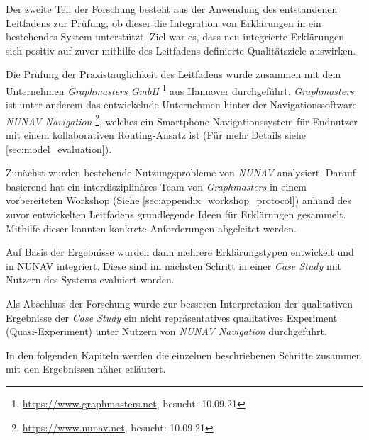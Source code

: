 \bigbreak

Der zweite Teil der Forschung besteht aus der Anwendung des entstandenen Leitfadens zur Prüfung, ob dieser die Integration von Erklärungen in ein bestehendes System unterstützt. Ziel war es, dass neu integrierte Erklärungen sich positiv auf zuvor mithilfe des Leitfadens definierte Qualitätsziele auswirken.

Die Prüfung der Praxistauglichkeit des Leitfadens wurde zusammen mit dem Unternehmen \textit{Graphmasters GmbH} \footnote{\url{https://www.graphmasters.net}, besucht: 10.09.21} aus Hannover durchgeführt. \textit{Graphmasters} ist unter anderem das entwickelnde Unternehmen hinter der Navigationssoftware \textit{NUNAV Navigation} \footnote{\url{https://www.nunav.net}, besucht: 10.09.21}, welches ein Smartphone-Navigationssystem für Endnutzer mit einem kollaborativen Routing-Ansatz ist (Für mehr Details siehe \autoref{sec:model_evaluation}).

Zunächst wurden bestehende Nutzungsprobleme von \textit{NUNAV} analysiert. Darauf basierend hat ein interdisziplinäres Team von \textit{Graphmasters} in einem vorbereiteten Workshop (Siehe \autoref{sec:appendix_workshop_protocol}) anhand des zuvor entwickelten Leitfadens grundlegende Ideen für Erklärungen gesammelt. Mithilfe dieser konnten konkrete Anforderungen abgeleitet werden.

Auf Basis der Ergebnisse wurden dann mehrere Erklärungstypen entwickelt und in NUNAV integriert. Diese sind im nächsten Schritt in einer \textit{Case Study} mit Nutzern des Systems evaluiert worden.

Als Abschluss der Forschung wurde zur besseren Interpretation der qualitativen Ergebnisse der \textit{Case Study} ein nicht repräsentatives qualitatives Experiment (Quasi-Experiment) unter Nutzern von \textit{NUNAV Navigation} durchgeführt.

\bigskip

In den folgenden Kapiteln werden die einzelnen beschriebenen Schritte zusammen mit den Ergebnissen näher erläutert.